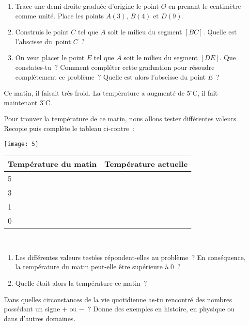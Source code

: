 \begin{activite}

\begin{partie}
 \begin{enumerate}
  \item Trace une demi-droite graduée d'origine le point $O$ en prenant le centimètre comme unité. Place les points $A(3)$, $B(4)$ et $D(9)$.
  \item Construis le point $C$ tel que $A$ soit le milieu du segment $[BC]$. Quelle est l'abscisse du point $C$ ?
  \item On veut placer le point $E$ tel que $A$ soit le milieu du segment $[DE]$. Que constates-tu ? Comment compléter cette graduation pour résoudre complètement ce problème ? Quelle est alors l'abscisse du point $E$ ?
  \end{enumerate}
\end{partie}

\begin{partie}
 \begin{minipage}[t]{0.40\linewidth}
Ce matin, il faisait très froid. La température a augmenté de \textcolor{H1}{$5^\circ$C}, il fait maintenant $3^\circ$C.
 
 Pour trouver la température de ce matin, nous allons tester différentes valeurs. Recopie puis complète le tableau ci-contre :
 
  \end{minipage} \hfill%
  \begin{minipage}[t]{0.56\linewidth}
  \centering
  \texttt{[image: 5]}
  
  \begin{tabularx}{0.8\linewidth}{|X|X|}
   \hline
   \rowcolor{J2} Température du matin & Température actuelle \\\hline
   \rowcolor{J2} 5 & \\\hline
   \rowcolor{J2} 3 & \\\hline
   \rowcolor{J2} 1 & \\\hline
   \rowcolor{J2} 0 & \\\hline
   \end{tabularx}
   \end{minipage} \\
   
  \begin{enumerate}
  \item Les différentes valeurs testées répondent-elles au problème ? En conséquence, la température du matin peut-elle être supérieure à 0 ?
  \item Quelle était alors la température ce matin ?
  \end{enumerate}
\end{partie}

\begin{partie}
Dans quelles circonstances de la vie quotidienne as-tu rencontré des nombres possédant un signe $+$ ou $-$ ? Donne des exemples en histoire, en physique ou dans d'autres domaines. 
\end{partie}

\end{activite}

